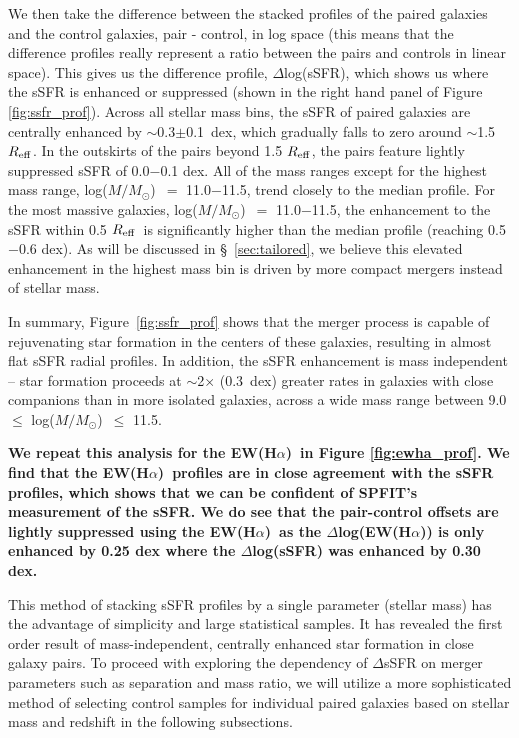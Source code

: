 \documentclass[iop,revtex4,twocolumn,apj,numberedappendix,appendixfloats]{emulateapj}
\newcommand{\reff}{$R_{\rm eff}$}
\newcommand{\ewha}{EW(H$\alpha$)}
\newcommand{\logm}{log($M/M_{\odot}$)}
\begin{document}
We then take the difference between the stacked profiles of the paired galaxies and the control galaxies, pair - control, in log space (this means that the difference profiles really represent a ratio between the pairs and controls in linear space). This gives us the difference profile, $\Delta$log(sSFR), which shows us where the sSFR is enhanced or suppressed (shown in the right hand panel of Figure \ref{fig:ssfr_prof}). Across all stellar mass bins, the sSFR of paired galaxies are centrally enhanced by $\sim$0.3$\pm$0.1~dex, which gradually falls to zero around $\sim$1.5 \reff. In the outskirts of the pairs beyond 1.5 \reff, the pairs feature lightly suppressed sSFR of 0.0$-$0.1 dex. All of the mass ranges except for the highest mass range, \logm\ $=$ 11.0$-$11.5, trend closely to the median profile. For the most massive galaxies, \logm\ $=$ 11.0$-$11.5, the enhancement to the sSFR within 0.5 \reff\ is significantly higher than the median profile (reaching 0.5$-$0.6 dex). As will be discussed in \S~\ref{sec:tailored}, we believe this elevated enhancement in the highest mass bin is driven by more compact mergers instead of stellar mass. 

In summary, Figure~\ref{fig:ssfr_prof} shows that the merger process is capable of rejuvenating star formation in the centers of these galaxies, resulting in almost flat sSFR radial profiles. In addition, the sSFR enhancement is mass independent -- star formation proceeds at $\sim$2$\times$ (0.3~dex) greater rates in galaxies with close companions than in more isolated galaxies, across a wide mass range between 9.0 $\leq$ \logm\ $\leq$ 11.5.

\textbf{ 
We repeat this analysis for the \ewha\ in Figure \ref{fig:ewha_prof}. We find that the \ewha\ profiles are in close agreement with the sSFR profiles, which shows that we can be confident of {\sc SPFIT}'s measurement of the sSFR. We do see that the pair-control offsets are lightly suppressed using the \ewha\ as the $\Delta$log(\ewha) is only enhanced by 0.25 dex where the $\Delta$log(sSFR) was enhanced by 0.30 dex. 
}

This method of stacking sSFR profiles by a single parameter (stellar mass) has the advantage of simplicity and large statistical samples. It has revealed the first order result of mass-independent, centrally enhanced star formation in close galaxy pairs. To proceed with exploring the dependency of $\Delta$sSFR on merger parameters such as separation and mass ratio, we will utilize a more sophisticated method of selecting control samples for individual paired galaxies based on stellar mass and redshift in the following subsections.  
\end{document}
